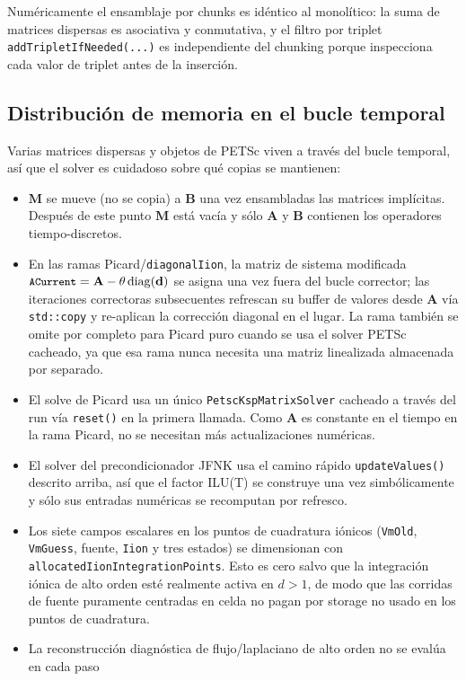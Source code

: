 \documentclass[11pt,a4paper]{article}
\newcommand{\code}[1]{\texttt{\small #1}}
\newcommand{\Mmass}{\mathbf{M}}
\newcommand{\Aimp}{\mathbf{A}}
\newcommand{\Bimp}{\mathbf{B}}
\begin{document}
Numéricamente el ensamblaje por chunks es idéntico al monolítico: la suma de matrices dispersas
es asociativa y conmutativa, y el filtro por triplet \code{addTripletIfNeeded(...)} es
independiente del chunking porque inspecciona cada valor de triplet antes de la inserción.

\subsection{Distribución de memoria en el bucle temporal}
\label{sec:memoria-loop}

Varias matrices dispersas y objetos de PETSc viven a través del bucle temporal, así que el
solver es cuidadoso sobre qué copias se mantienen:
\begin{itemize}
\item $\Mmass$ se mueve (no se copia) a $\Bimp$ una vez ensambladas las matrices implícitas.
Después de este punto $\Mmass$ está vacía y sólo $\Aimp$ y $\Bimp$ contienen los operadores
tiempo-discretos.
\item En las ramas Picard/\code{diagonalIion}, la matriz de sistema modificada
$\code{ACurrent}=\Aimp-\theta\,\mathrm{diag}(\mathbf{d})$ se asigna una vez fuera del bucle
corrector; las iteraciones correctoras subsecuentes refrescan su buffer de valores desde
$\Aimp$ vía \code{std::copy} y re-aplican la corrección diagonal en el lugar. La rama también
se omite por completo para Picard puro cuando se usa el solver PETSc cacheado, ya que esa rama
nunca necesita una matriz linealizada almacenada por separado.
\item El solve de Picard usa un único \code{PetscKspMatrixSolver} cacheado a través del run vía
\code{reset()} en la primera llamada. Como $\Aimp$ es constante en el tiempo en la rama Picard,
no se necesitan más actualizaciones numéricas.
\item El solver del precondicionador JFNK usa el camino rápido \code{updateValues()} descrito
arriba, así que el factor ILU(T) se construye una vez simbólicamente y sólo sus entradas
numéricas se recomputan por refresco.
\item Los siete campos escalares en los puntos de cuadratura iónicos (\code{VmOld},
\code{VmGuess}, fuente, \code{Iion} y tres estados) se dimensionan con
\code{allocatedIionIntegrationPoints}. Esto es cero salvo que la integración iónica de alto
orden esté realmente activa en $d>1$, de modo que las corridas de fuente puramente centradas
en celda no pagan por storage no usado en los puntos de cuadratura.
\item La reconstrucción diagnóstica de flujo/laplaciano de alto orden no se evalúa en cada paso

\end{itemize}
\end{document}
